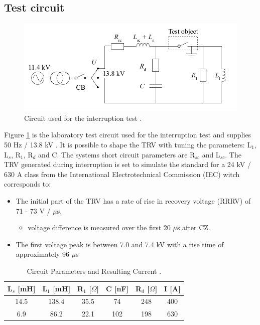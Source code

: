 \documentclass[10pt,a4paper,twoside]{article}
\begin{document}
\subsection{Test circuit}

\begin{figure} [H]
\centering
\includegraphics[scale=0.3]{Bilder/Method/circuit.png}
\caption{Circuit used for the interruption test \cite{bib:AFIMVLBA}.} \label{fig:testCurcuit}
\end{figure}

Figure \ref{fig:testCurcuit} is the laboratory test circuit used for the interruption test and supplies 50 Hz / 13.8 kV . It is possible to shape the TRV with tuning the parameters: L$_1$, L$_s$, R$_1$, R$_d$ and C. The systems short circuit parameters are R$_{sc}$ and L$_{sc}$. The TRV generated during interruption is set to simulate the standard for a 24 kV / 630 A class from the International Electrotechnical Commission (IEC) witch corresponds to:

\begin{itemize}
\item The initial part of the TRV has a rate of rise in recovery voltage (RRRV) of 71 - 73 V / $\mu$s.
	\begin{itemize}
		\item voltage difference is measured over the first 20 $\mu$s after CZ.
	\end{itemize}
\item The first voltage peak is between 7.0 and 7.4 kV with a rise time of approximately 96 $\mu$s
\end{itemize}

\begin{table}[H]
\center
\caption{Circuit Parameters and Resulting Current \cite{bib:AFIMVLBA}. }
\begin{tabular}{|c|c|c|c|c|c|}
\hline 
L$_s$ [mH] & L$_1$ [mH] & R$_1$ [$\Omega$] & C [nF] & R$_{d}$ [$\Omega$] & I [A] \\ 
\hline 
14.5 & 138.4 & 35.5 & 74 & 248 & 400 \\ 
\hline 
6.9 & 86.2 & 22.1 & 102 & 198 & 630 \\ 
\hline 
\end{tabular} 
\label{tab:testParameters}
\end{table}
\end{document}

